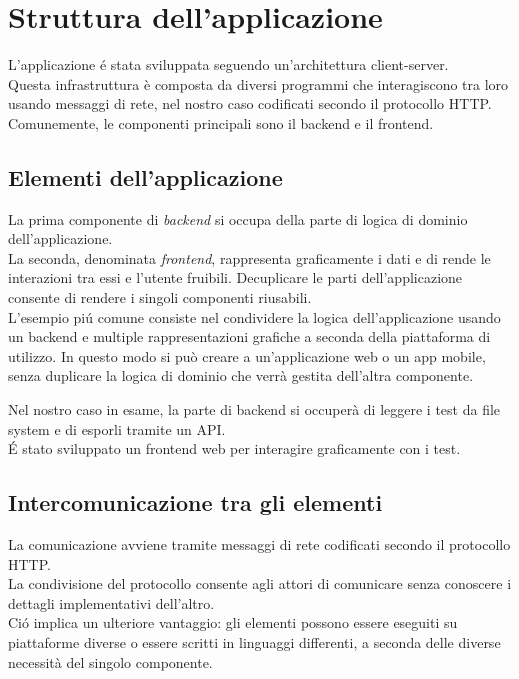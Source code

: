 \chapter{Struttura dell'applicazione\label{appstruct}}
    L'applicazione \'e stata sviluppata seguendo un'architettura client-server.\\
    
    Questa infrastruttura è composta da diversi programmi che interagiscono tra loro usando messaggi di rete, nel nostro caso codificati secondo il protocollo HTTP.
    Comunemente, le componenti principali sono il backend e il frontend.\\

    \section{Elementi dell'applicazione}
        La prima componente di \textit{backend} si occupa della parte di logica di dominio dell'applicazione.\\
        La seconda, denominata \textit{frontend}, rappresenta graficamente i dati e di rende le interazioni tra essi e l'utente fruibili.
        Decuplicare le parti dell'applicazione consente di rendere i singoli componenti riusabili.\\

        L'esempio pi\'u comune consiste nel condividere la logica dell'applicazione usando un backend e multiple rappresentazioni grafiche a seconda della piattaforma di utilizzo.
        In questo modo si può creare a un'applicazione web o un app mobile, senza duplicare la logica di dominio che verrà gestita dell'altra componente.
        
        Nel nostro caso in esame, la parte di backend si occuperà di leggere i test da file system e di esporli tramite un API.\\
        \'E stato sviluppato un frontend web per interagire graficamente con i test.\\

    \section{Intercomunicazione tra gli elementi}
        La comunicazione avviene tramite messaggi di rete codificati secondo il protocollo HTTP.\\
        La condivisione del protocollo consente agli attori di comunicare senza conoscere i dettagli implementativi dell'altro.\\
        Ci\'o implica un ulteriore vantaggio: gli elementi possono essere eseguiti su piattaforme diverse o essere scritti in linguaggi differenti, a seconda delle diverse necessità del singolo componente.\\
        
